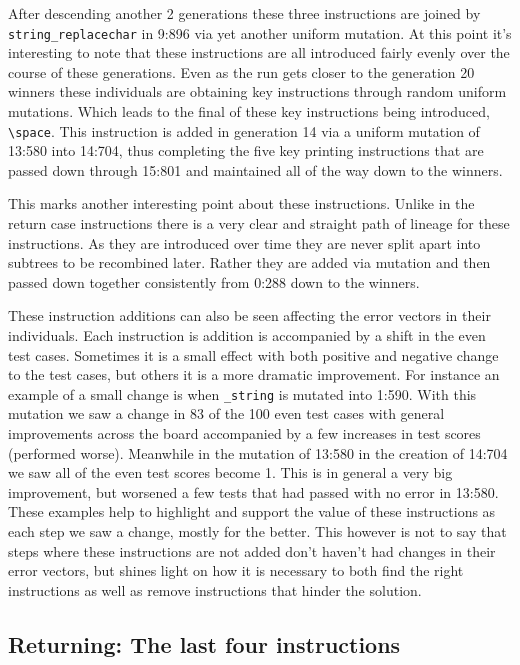 After descending another 2 generations these three instructions are joined by \texttt{string\_replacechar}
in 9:896 via yet another uniform mutation. At this point it's interesting to note that these instructions are
all introduced fairly evenly over the course of these generations. Even as the run gets closer to the generation
20 winners these individuals are obtaining key instructions through random uniform mutations. Which leads to
the final of these key instructions being introduced, \texttt{\textbackslash space}.
This instruction is added in generation 14 via a uniform mutation of 13:580 into 14:704, thus completing the five key printing
instructions that are passed down through 15:801 and maintained all of the way down to the winners.

This marks another interesting point about these instructions. Unlike in the return case instructions there is a 
very clear and straight path of lineage for these instructions. As they are introduced over time they 
are never split apart into subtrees to be recombined later. Rather they are added via mutation and 
then passed down together consistently from 0:288 down to the winners.

These instruction additions can also be seen affecting the error vectors in their individuals. Each instruction is addition
is accompanied by a shift in the even test cases. Sometimes it is a small effect with both positive and negative change
to the test cases, but others it is a more dramatic improvement. For instance an example of a small change is when
\texttt{\printindex\_string} is mutated into 1:590. With this mutation we saw a change in 83 of the 100 even test cases
with general improvements across the board accompanied by a few increases in test scores (performed worse). Meanwhile in
the mutation of 13:580  in the creation of 14:704 we saw all of the even test scores become 1. This is in general a very
big improvement, but worsened a few tests that had passed with no error in 13:580. These examples help to highlight
and support the value of these instructions as each step we saw a change, mostly for the better. This however is not to
say that steps where these instructions are not added don't haven't had changes in their error vectors, but shines light
on how it is necessary to both find the right instructions as well as remove instructions that hinder the solution.

\subsection{Returning: The last four instructions}
\label{sec:Returning}

